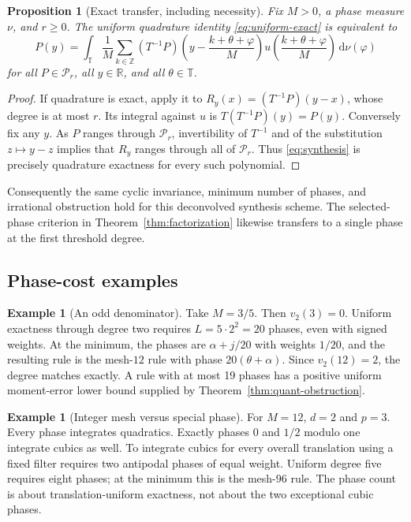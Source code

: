 \documentclass[11pt,a4paper]{article}
\numberwithin{equation}{section}
\newtheorem{proposition}[theorem]{Proposition}
\theoremstyle{definition}
\newtheorem{example}[theorem]{Example}
\theoremstyle{remark}
\newcommand{\R}{\mathbb R}\newcommand{\Z}{\mathbb Z}\newcommand{\N}{\mathbb N}
\newcommand{\T}{\mathbb T}\newcommand{\C}{\mathbb C}
\newcommand{\dd}{\,\mathrm d}\newcommand{\ii}{\mathrm i}
\newcommand{\Pol}{\mathcal P}\newcommand{\norm}[1]{\left\lVert#1\right\rVert}
\begin{document}
\begin{proposition}[Exact transfer, including necessity]
\label{prop:transfer}
Fix $M>0$, a phase measure $\nu$, and $r\ge0$. The uniform quadrature
identity \eqref{eq:uniform-exact} is equivalent to
\begin{equation}
 P(y)=\int_\T\frac1M\sum_{k\in\Z}
 (T^{-1}P)\!\left(y-\frac{k+\theta+\varphi}{M}\right)
 u\!\left(\frac{k+\theta+\varphi}{M}\right)\dd\nu(\varphi)
 \label{eq:synthesis}
\end{equation}
for all $P\in\Pol_r$, all $y\in\R$, and all $\theta\in\T$.
\end{proposition}
\begin{proof}
If quadrature is exact, apply it to
$R_y(x)=(T^{-1}P)(y-x)$, whose degree is at most $r$.
Its integral against $u$ is $T(T^{-1}P)(y)=P(y)$.
Conversely fix any $y$. As $P$ ranges through $\Pol_r$, invertibility
of $T^{-1}$ and of the substitution $z\mapsto y-z$ implies that $R_y$
ranges through all of $\Pol_r$. Thus \eqref{eq:synthesis} is precisely
quadrature exactness for every such polynomial.
\end{proof}

Consequently the same cyclic invariance, minimum number of phases, and
irrational obstruction hold for this deconvolved synthesis scheme.
The selected-phase criterion in Theorem~\ref{thm:factorization} likewise
transfers to a single phase at the first threshold degree.

\subsection{Phase-cost examples}

\begin{example}[An odd denominator]
Take $M=3/5$. Then $v_2(3)=0$.
Uniform exactness through degree two requires
$L=5\cdot2^2=20$ phases, even with signed weights. At the minimum,
the phases are $\alpha+j/20$ with weights $1/20$, and the resulting
rule is the mesh-$12$ rule with phase $20(\theta+\alpha)$.
Since $v_2(12)=2$, the degree matches exactly. A rule with at most
19 phases has a positive uniform moment-error lower bound supplied
by Theorem~\ref{thm:quant-obstruction}.
\end{example}

\begin{example}[Integer mesh versus special phase]
For $M=12$, $d=2$ and $p=3$.
Every phase integrates quadratics. Exactly phases $0$ and $1/2$
modulo one integrate cubics as well. To integrate cubics for every
overall translation using a fixed filter requires two antipodal
phases of equal weight. Uniform degree five requires eight phases;
at the minimum this is the mesh-$96$ rule. The phase count is about
translation-uniform exactness, not about the two exceptional cubic phases.
\end{example}
\end{document}
